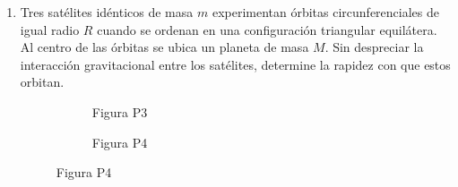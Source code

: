 \documentclass[letterpaper,11pt]{article}
\begin{document}
\begin{enumerate}
\item Tres satélites idénticos de masa $m$ experimentan órbitas circunferenciales de igual radio $R$ cuando se ordenan en una configuración triangular equilátera. Al centro de las órbitas se ubica un planeta de masa $M$. Sin despreciar la interacción gravitacional entre los satélites, determine la rapidez con que estos orbitan.

\begin{figure}[H]
    \centering
    \begin{subfigure}[t]{0.45\textwidth}
        \centering
        
        \caption*{Figura P3}
    \end{subfigure}
    \hspace{0.1em}
    \begin{subfigure}[t]{0.45\textwidth}
        \centering
        
        \caption*{Figura P4}
    \end{subfigure}
\end{figure}



\end{enumerate}
\end{document}
